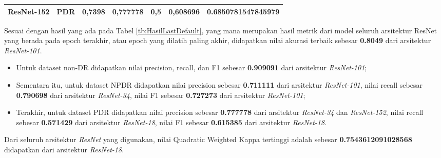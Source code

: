\begin{table}[hbtp]
\begin{center}
\begin{tabular}{|c|l|c|l|l|l|c|}
			\multirow{-3}{*}{ResNet-152} & PDR                                                & \multirow{-3}{*}{0,7398} & \textbf{0,777778}                                          & 0,5                                              & 0,608696                                        & \multirow{-3}{*}{0.6850781547845979} \\ \hline
		\end{tabular}
	\end{center}
\end{table}

Sesuai dengan hasil yang ada pada Tabel \ref{tb:HasilLastDefault}, yang mana merupakan hasil metrik dari model seluruh arsitektur ResNet yang berada pada epoch terakhir, atau epoch yang dilatih paling akhir, didapatkan nilai akurasi terbaik sebesar \textbf{0.8049} dari arsitektur \emph{ResNet-101}.

\begin{itemize}
	
	\item Untuk dataset non-DR didapatkan nilai precision, recall, dan F1 sebesar \textbf{0.909091} dari arsitektur \emph{ResNet-101};
	
	\item Sementara itu, untuk dataset NPDR didapatkan nilai precision sebesar \textbf{0.711111} dari arsitektur \emph{ResNet-101}, nilai recall sebesar \textbf{0.790698} dari arsitektur \emph{ResNet-34}, nilai F1 sebesar \textbf{0.727273} dari arsitektur \emph{ResNet-101};
	
	\item Terakhir, untuk dataset PDR didapatkan nilai precision sebesar \textbf{0.777778} dari arsitektur \emph{ResNet-34} dan \emph{ResNet-152}, nilai recall sebesar \textbf{0.571429} dari arsitektur \emph{ResNet-18}, nilai F1 sebesar \textbf{0.615385} dari arsitektur \emph{ResNet-18}.
	
\end{itemize}

Dari seluruh arsitektur \emph{ResNet} yang digunakan, nilai Quadratic Weighted Kappa tertinggi adalah sebesar \textbf{0.7543612091028568} didapatkan dari arsitektur \emph{ResNet-18}.

